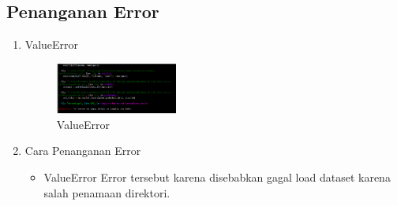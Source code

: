 \subsection{Penanganan Error}
\begin{enumerate}
	\item ValueError
	\begin{figure}[H]
		\includegraphics[width=4cm]{figures/1174005/tugas8/error/1.PNG}
		\centering
		\caption{ValueError}
	\end{figure}

	\item Cara Penanganan Error
	\begin{itemize}
		\item ValueError
		\hfill\break
		Error tersebut karena disebabkan gagal load dataset karena salah penamaan direktori.
	\end{itemize}
\end{enumerate}


